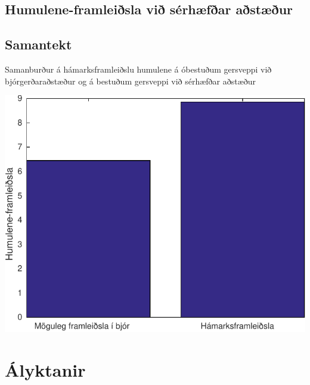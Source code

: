 \documentclass[11pt]{article}
\makeatletter
\newenvironment{figureonecolumn}{\begin{minipage}{\linewidth}\begin{center}\def\@captype{figure}}{\end{center}\end{minipage}}
\makeatother
\begin{document}
\begin{multicols}{2}
\subsection{Humulene-framleiðsla við sérhæfðar aðstæður}

\subsection{Samantekt}

\begin{figureonecolumn}
\caption{Samanburður á hámarksframleiðslu humulene á óbestuðum gersveppi við bjórgerðaraðstæður og á bestuðum gersveppi við sérhæfðar aðstæður}
\includegraphics[width=\linewidth]{Pics/ComparativeProduction}
\end{figureonecolumn}

\section{Ályktanir}



\end{multicols}
\end{document}
